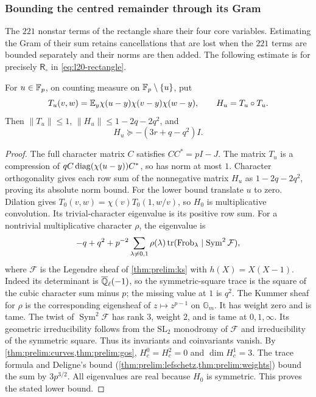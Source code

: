 \subsubsection{Bounding the centred remainder through its Gram}

The $221$ nonstar terms of the rectangle share their four core
variables. Estimating the Gram of their sum retains cancellations
that are lost when the $221$ terms are bounded separately and their
norms are then added. The following estimate
is for precisely $\mathsf R_\circ$ in \eqref{eq:l20-rectangle}.

\begin{lemma}\label{lem:rectangle-mellin}
For $u\in\mathbb F_p$, on counting measure on $\mathbb F_p\setminus\{u\}$, put
\[
 T_u(v,w)=\mathbb E_y\chi(u-y)\chi(v-y)\chi(w-y),\qquad H_u=T_u\circ T_u.
\]
Then $\|T_u\|\le1$, $\|H_u\|\le1-2q-2q^2$, and
\[
 H_u\succeq-(3r+q-q^2)I.
\]
\end{lemma}
\begin{proof}
The full character matrix $C$ satisfies $CC^*=pI-J$.
The matrix $T_u$ is a compression of
$qC\operatorname{diag}(\chi(u-y))C^*$, so has norm at most $1$.
Character orthogonality gives each row sum of the nonnegative matrix
$H_u$ as $1-2q-2q^2$, proving its absolute norm bound.
For the lower bound translate $u$ to zero. Dilation gives
$T_0(v,w)=\chi(v)T_0(1,w/v)$, so $H_0$ is multiplicative convolution.
Its trivial-character eigenvalue is its positive row sum. For a
nontrivial multiplicative character $\rho$, the eigenvalue is
\[
 -q+q^2+p^{-2}\sum_{\lambda\ne0,1}\rho(\lambda)
  \operatorname{tr}(\operatorname{Frob}_\lambda\mid\operatorname{Sym}^2\mathcal F),
\]
where $\mathcal F$ is the Legendre sheaf of
\cref{thm:prelim:ks} with $h(X)=X(X-1)$. Indeed its determinant is
$\overline{\mathbb Q}_\ell(-1)$, so the symmetric-square trace is the square
of the cubic character sum minus $p$; the missing value at $1$ is $q^2$.
The Kummer sheaf for $\rho$ is the corresponding eigensheaf of
$z\mapsto z^{p-1}$ on $\mathbb G_m$. It has weight zero and is tame.
The twist of $\operatorname{Sym}^2\mathcal F$ has rank $3$, weight $2$,
and is tame at $0,1,\infty$. Its geometric irreducibility follows from
the $\mathrm{SL}_2$ monodromy of $\mathcal F$ and irreducibility of
the symmetric square. Thus its invariants and coinvariants vanish.
By \cref{thm:prelim:curves,thm:prelim:gos}, $H_c^0=H_c^2=0$ and
$\dim H_c^1=3$. The trace formula and Deligne's bound
(\cref{thm:prelim:lefschetz,thm:prelim:weights}) bound the sum by
$3p^{3/2}$. All eigenvalues are real because $H_0$ is symmetric.
This proves the stated lower bound.
\end{proof}

